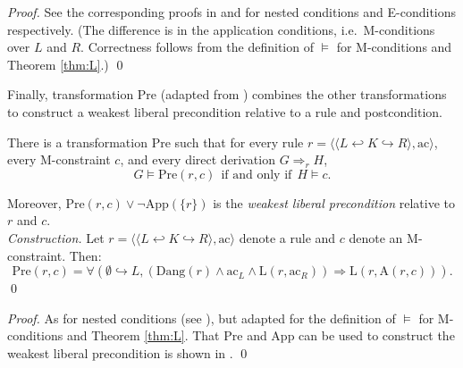 \documentclass{llncs}
\begin{document}
\begin{proof}
	See the corresponding proofs in \cite{Pennemann09a} and \cite{Poskitt13a} for nested conditions and E-conditions respectively. (The difference is in the application conditions, i.e.\ M-conditions over $L$ and $R$. Correctness follows from the definition of $\models$ for M-conditions and Theorem \ref{thm:L}.)
	\qed
\end{proof}

Finally, transformation Pre (adapted from \cite{Habel-Pennemann-Rensink06a}) combines the other transformations to construct a weakest liberal precondition relative to a rule and postcondition.

\begin{theorem}\label{thm:Pre}\rm
	There is a transformation Pre such that for every rule $r = \langle \langle L \hookleftarrow K \hookrightarrow R \rangle, \text{ac} \rangle$, every M-constraint $c$, and every direct derivation $G\Rightarrow_r H$,
	\[ G \models \text{Pre}(r,c)\ \ \text{if and only if}\ \ H \models c. \]
	
	\noindent Moreover, $\text{Pre}(r,c) \vee \neg \text{App}(\{r\})$ is the \emph{weakest liberal precondition} relative to $r$ and $c$.\\

\noindent \emph{Construction.} Let $r = \langle \langle L \hookleftarrow K \hookrightarrow R \rangle, \text{ac} \rangle$ denote a rule and $c$ denote an M-constraint. Then:
	\[ \text{Pre}(r,c) = \forall(\emptyset\hookrightarrow L, (\text{Dang}(r) \wedge \text{ac}_L \wedge \text{L}(r,\text{ac}_R)) \Rightarrow \text{L}(r,\text{A}(r,c))). \]
	\qed
\end{theorem}
	
\begin{proof}
	As for nested conditions (see \cite{Pennemann09a}), but adapted for the definition of $\models$ for M-conditions and Theorem \ref{thm:L}. That Pre and App can be used to construct the weakest liberal precondition is shown in \cite{Poskitt13a}.
	\qed
\end{proof}
	
\end{document}
